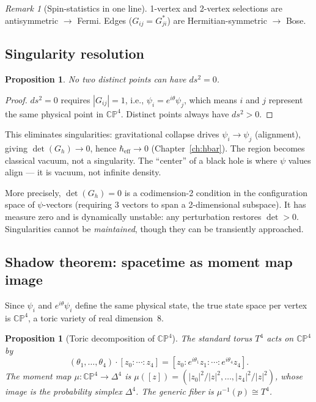 \documentclass[12pt]{article}
\newtheorem{proposition}[theorem]{Proposition}
\theoremstyle{remark}
\newtheorem{remark}[theorem]{Remark}
\theoremstyle{definition}
\begin{document}
\begin{remark}[Spin-statistics in one line]
1-vertex and 2-vertex selections are antisymmetric $\to$ Fermi. Edges ($G_{ij} = G_{ji}^*$) are Hermitian-symmetric $\to$ Bose.
\end{remark}

\subsection{Singularity resolution}

\begin{proposition}
No two distinct points can have $ds^2 = 0$.
\end{proposition}

\begin{proof}
$ds^2 = 0$ requires $|G_{ij}| = 1$, i.e., $\psi_i = e^{i\theta}\psi_j$, which means $i$ and $j$ represent the same physical point in $\mathbb{CP}^4$. Distinct points always have $ds^2 > 0$.
\end{proof}

This eliminates singularities: gravitational collapse drives $\psi_i \to \psi_j$ (alignment), giving $\det(G_h) \to 0$, hence $\hbar_\text{eff} \to 0$ (Chapter~\ref{ch:hbar}). The region becomes classical vacuum, not a singularity. The ``center'' of a black hole is where $\psi$ values align --- it is vacuum, not infinite density.

More precisely, $\det(G_h) = 0$ is a codimension-2 condition in the configuration space of $\psi$-vectors (requiring 3 vectors to span a 2-dimensional subspace).  It has measure zero and is dynamically unstable: any perturbation restores $\det > 0$.  Singularities cannot be \emph{maintained}, though they can be transiently approached.

\subsection{Shadow theorem: spacetime as moment map image}
\label{sec:shadow}

Since $\psi_i$ and $e^{i\theta}\psi_i$ define the same physical state, the true state space per vertex is $\mathbb{CP}^4$, a toric variety of real dimension~8.

\begin{proposition}[Toric decomposition of $\mathbb{CP}^4$]
\label{prop:toric}
The standard torus $T^4$ acts on $\mathbb{CP}^4$ by
\begin{equation}
(\theta_1,\ldots,\theta_4)\cdot[z_0:\cdots:z_4]
= [z_0 : e^{i\theta_1}z_1 : \cdots : e^{i\theta_4}z_4].
\end{equation}
The moment map $\mu: \mathbb{CP}^4 \to \Delta^4$ is $\mu([z]) = (|z_0|^2/|z|^2,\ldots,|z_4|^2/|z|^2)$, whose image is the probability simplex $\Delta^4$.  The generic fiber is $\mu^{-1}(p) \cong T^4$.
\end{proposition}
\end{document}
